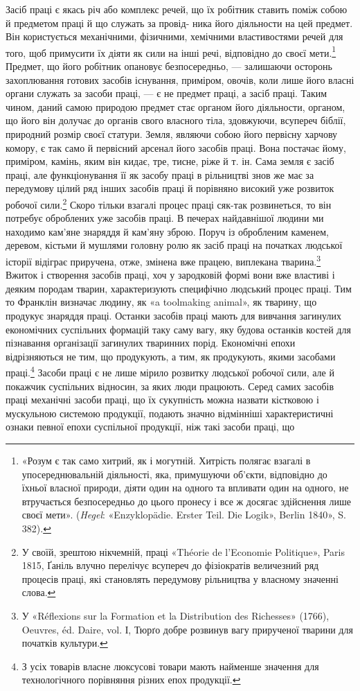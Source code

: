 Засіб праці є якась річ або комплекс речей, що їх робітник
ставить поміж собою й предметом праці й що служать за провід-
\parbreak{}
ника його діяльности на цей предмет. Він користується механічними,
фізичними, хемічними властивостями речей для того, щоб
примусити їх діяти як сили на інші речі, відповідно до своєї мети.\footnote{
«Розум є так само хитрий, як і могутній. Хитрість полягає взагалі
в упосереднювальній діяльності, яка, примушуючи об’єкти, відповідно
до їхньої власної природи, діяти один на одного та впливати один на
одного, не втручається безпосередньо до цього пронесу і все ж досягає
здійснення лише своєї мети». (\emph{Hegel}: «Enzyklopädie. Erster Teil. Die
Logik», Berlin 1840», S. 382).
}
Предмет, що його робітник опановує безпосередньо, — залишаючи
осторонь захоплювання готових засобів існування, приміром,
овочів, коли лише його власні органи служать за засоби праці, —
є не предмет праці, а засіб праці. Таким чином, даний самою
природою предмет стає органом його діяльности, органом, що
його він долучає до органів свого власного тіла, здовжуючи,
всупереч біблії, природний розмір своєї статури. Земля, являючи
собою його первісну харчову комору, є так само й первісний арсенал
його засобів праці. Вона постачає йому, приміром, камінь,
яким він кидає, тре, тисне, ріже й т. ін. Сама земля є засіб праці,
але функціонування її як засобу праці в рільництві знов же
має за передумову цілий ряд інших засобів праці й порівняно
високий уже розвиток робочої сили.\footnote{
У своїй, зрештою нікчемній, праці «Théorie de l’Economie Politique»,
Paris 1815, Ґаніль влучно перелічує всупереч до фізіократів величезний
ряд процесів праці, які становлять передумову рільництва у власному
значенні слова.
} Скоро тільки взагалі процес
праці сяк-так розвинеться, то він потребує оброблених уже засобів
праці. В печерах найдавнішої людини ми находимо кам’яне
знаряддя й кам’яну зброю. Поруч із обробленим каменем, деревом,
кістьми й мушлями головну ролю як засіб праці на початках
людської історії відіграє приручена, отже, змінена вже працею,
виплекана тварина.\footnote{
У «Réflexions sur la Formation et la Distribution des Richesses»
(1766), Oeuvres, éd. Daire, vol. І, Тюрґо добре розвинув вагу прирученої
тварини для початків культури.
} Вжиток і створення засобів праці,
хоч у зародковій формі вони вже властиві і деяким породам тварин,
характеризують специфічно людський процес праці. Тим
то Франклін визначає людину, як «a toolmaking animal», як
тварину, що продукує знаряддя праці. Останки засобів праці
мають для вивчання загинулих економічних суспільних формацій
таку саму вагу, яку будова останків костей для пізнавання організації
загинулих тваринних порід. Економічні епохи відрізняються
не тим, що продукують, а тим, як продукують, якими
засобами праці.\footnote{
З усіх товарів власне люксусові товари мають найменше значення
для технологічного порівняння різних епох продукції.
} Засоби праці є не лише мірило розвитку людської
робочої сили, але й покажчик суспільних відносин, за яких
люди працюють. Серед самих засобів праці механічні засоби праці,
що їх сукупність можна назвати кістковою і мускульною системою
продукції, подають значно відмінніші характеристичні ознаки
певної епохи суспільної продукції, ніж такі засоби праці, що
\parbreak{}  %
